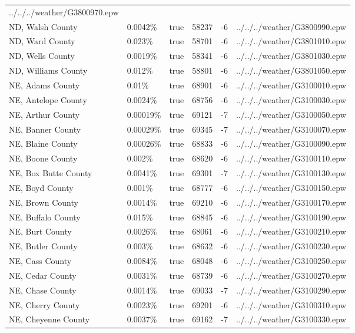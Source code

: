 \begin{longtable}[]{@{}llllll@{}}
../../../weather/G3800970.epw \\
ND, Walsh County & 0.0042\% & true & 58237 & -6 &
../../../weather/G3800990.epw \\
ND, Ward County & 0.023\% & true & 58701 & -6 &
../../../weather/G3801010.epw \\
ND, Wells County & 0.0019\% & true & 58341 & -6 &
../../../weather/G3801030.epw \\
ND, Williams County & 0.012\% & true & 58801 & -6 &
../../../weather/G3801050.epw \\
NE, Adams County & 0.01\% & true & 68901 & -6 &
../../../weather/G3100010.epw \\
NE, Antelope County & 0.0024\% & true & 68756 & -6 &
../../../weather/G3100030.epw \\
NE, Arthur County & 0.00019\% & true & 69121 & -7 &
../../../weather/G3100050.epw \\
NE, Banner County & 0.00029\% & true & 69345 & -7 &
../../../weather/G3100070.epw \\
NE, Blaine County & 0.00026\% & true & 68833 & -6 &
../../../weather/G3100090.epw \\
NE, Boone County & 0.002\% & true & 68620 & -6 &
../../../weather/G3100110.epw \\
NE, Box Butte County & 0.0041\% & true & 69301 & -7 &
../../../weather/G3100130.epw \\
NE, Boyd County & 0.001\% & true & 68777 & -6 &
../../../weather/G3100150.epw \\
NE, Brown County & 0.0014\% & true & 69210 & -6 &
../../../weather/G3100170.epw \\
NE, Buffalo County & 0.015\% & true & 68845 & -6 &
../../../weather/G3100190.epw \\
NE, Burt County & 0.0026\% & true & 68061 & -6 &
../../../weather/G3100210.epw \\
NE, Butler County & 0.003\% & true & 68632 & -6 &
../../../weather/G3100230.epw \\
NE, Cass County & 0.0084\% & true & 68048 & -6 &
../../../weather/G3100250.epw \\
NE, Cedar County & 0.0031\% & true & 68739 & -6 &
../../../weather/G3100270.epw \\
NE, Chase County & 0.0014\% & true & 69033 & -7 &
../../../weather/G3100290.epw \\
NE, Cherry County & 0.0023\% & true & 69201 & -6 &
../../../weather/G3100310.epw \\
NE, Cheyenne County & 0.0037\% & true & 69162 & -7 &
../../../weather/G3100330.epw \\

\end{longtable}
